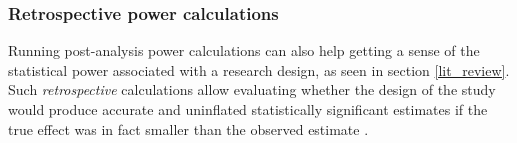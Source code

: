 \documentclass[usletter, 12pt]{article}
\begin{document}
				
			\subsubsection{Retrospective power calculations}\label{retro_calc}
			
				Running post-analysis power calculations can also help getting a sense of the statistical power associated with a research design, as seen in section \ref{lit_review}. Such \textit{retrospective} calculations allow evaluating whether the design of the study would produce accurate and uninflated statistically significant estimates if the true effect was in fact smaller than the observed estimate \citep{gelman_beyond_2014, ioannidis_power_2017, stommesReliability2023}. 
				
\end{document}
